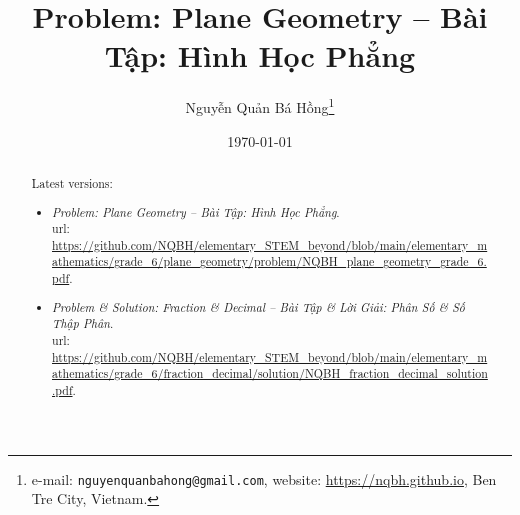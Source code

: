 \documentclass{article}
\title{Problem: Plane Geometry -- Bài Tập: Hình Học Phẳng}
\author{Nguyễn Quản Bá Hồng\footnote{e-mail: \texttt{nguyenquanbahong@gmail.com}, website: \url{https://nqbh.github.io}, Ben Tre City, Vietnam.}}
\date{\today}
\begin{document}
\maketitle
\begin{abstract}
	Latest versions:
	\begin{itemize}
		\item \textit{Problem: Plane Geometry -- Bài Tập: Hình Học Phẳng}.\\{\sc url}: \url{https://github.com/NQBH/elementary_STEM_beyond/blob/main/elementary_mathematics/grade_6/plane_geometry/problem/NQBH_plane_geometry_grade_6.pdf}.
		\item \textit{Problem \& Solution: Fraction \& Decimal -- Bài Tập \& Lời Giải: Phân Số {\it\&} Số Thập Phân}.\\{\sc url}: \url{https://github.com/NQBH/elementary_STEM_beyond/blob/main/elementary_mathematics/grade_6/fraction_decimal/solution/NQBH_fraction_decimal_solution.pdf}.
	\end{itemize}
\end{abstract}
\tableofcontents


\end{document}
